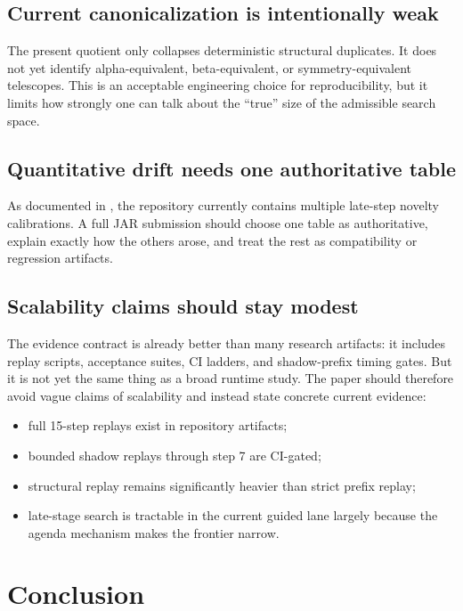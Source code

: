 \documentclass[11pt,a4paper]{article}
\begin{document}
\subsection{Current canonicalization is intentionally weak}

The present quotient only collapses deterministic structural duplicates. It does not yet identify alpha-equivalent, beta-equivalent, or symmetry-equivalent telescopes. This is an acceptable engineering choice for reproducibility, but it limits how strongly one can talk about the ``true'' size of the admissible search space.

\subsection{Quantitative drift needs one authoritative table}

As documented in , the repository currently contains multiple late-step novelty calibrations. A full JAR submission should choose one table as authoritative, explain exactly how the others arose, and treat the rest as compatibility or regression artifacts.

\subsection{Scalability claims should stay modest}

The evidence contract is already better than many research artifacts: it includes replay scripts, acceptance suites, CI ladders, and shadow-prefix timing gates. But it is not yet the same thing as a broad runtime study. The paper should therefore avoid vague claims of scalability and instead state concrete current evidence:
\begin{itemize}[nosep]
  \item full 15-step replays exist in repository artifacts;
  \item bounded shadow replays through step 7 are CI-gated;
  \item structural replay remains significantly heavier than strict prefix replay;
  \item late-stage search is tractable in the current guided lane largely because the agenda mechanism makes the frontier narrow.
\end{itemize}

\section{Conclusion}
\label{sec:conclusion}
\end{document}
